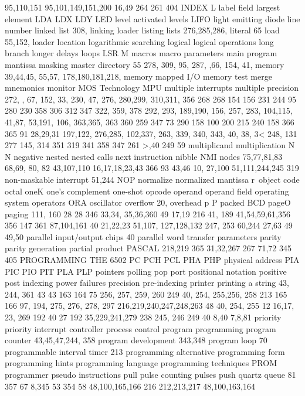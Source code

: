 {{{{{{{{{{{{{{{{{{{{{{{{{{{{{{{{{{{{{{{{{{{{{{{{{{{{{{{{{{{{{{{{{{{{{{{{{{{{{{{{{{{{{{{{{{{{{{{{{{{{{{{{{{{{{{{{{{{{{{{{{{{{{{{{{{{{{{{{{{{{95,110,151
95,101,149,151,200
16,49
264
261
404
INDEX
L
label field
largest element
LDA
LDX
LDY
LED
level activated
levels
LIFO
light emitting diode
line number
linked list
308,
linking loader
listing
lists 276,285,286,
literal 65
load 55,152,
loader
location
logarithmic searching
logical
logical operations
long branch
longer delays
loops
LSR
M
macros
macro parameters
main program
mantissa
masking
master directory
55
278,
309,
95,
287,
,66,
154,
41,
memory 39,44,45, 55,57,
178,180,181,218,
memory mapped I/O
memory test
merge
mnemonics
monitor
MOS Technology
MPU
multiple interrupts
multiple precision
272,
, 67, 152,
33, 230,
47, 276,
280,299,
310,311,
356
268
268
154
156
231
244
95
280
230
358
306
312
347
322, 359, 378
292, 293,
189,190,
156, 257,
283,
104,115,
41,87,
53,191,
106,
363,365,
363
360
259
347
73
290
158
100
200
215
240
158
366
365
91
28,29,31
197,122,
276,285,
102,337,
263,
339, 340,
343,
40,
38, 3<
248,
131
277
145,
314
351
319
341
358
347
261
>,40
249
59
multiplicand
multiplication
N
N
negative
nested
nested calls
next instruction
nibble
NMI
nodes
75,77,81,83
68,69, 80, 82
43,107,110
16,17,18,23,43
366
93
43,46
10, 27,100
51,111,244,245
319
non-maskable interrupt 51,244
NOP
normalize
normalized mantissa
r\
object code
octal
oneK
one's complement
one-shot
opcode
operand
operand field
operating system
operators
ORA
oscillator
overflow 20,
overhead
p
P
packed BCD
pageO
paging
111, 160
28
28
346
33,34, 35,36,360
49
17,19
216
41, 189
41,54,59,61,356
356
147
361
87,104,161
40
21,22,23 51,107,
127,128,132
247, 253
60,244
27,63
49
49,50
parallel input/output chips 40
parallel word transfer
parameters
parity
parity generation
partial product
PASCAL
218,219
365
31,32,267
267
71,72
345
405
PROGRAMMING THE 6502
PC
PCH
PCL
PHA
PHP
physical address
PIA
PIC
PIO
PIT
PLA
PLP
pointers
polling
pop
port
positional notation
positive
post indexing
power failures
precision
pre-indexing
printer
printing a string
43, 244, 361
43
43
163
164
75
256, 257, 259, 260
249
40, 254, 255,256, 258
213
165
166
97, 194, 275, 276, 278, 297
216,219,240,247,248,263
48
40, 254, 255
12
16,17, 23, 269
192
40
27
192
35,229,241,279
238
245, 246
249
40
8,40
7,8,81
priority
priority interrupt controller
process control
program
programming
program counter 43,45,47,244, 358
program development 343,348
program loop 70
programmable interval timer 213
programming alternative
programming form
programming hints
programming language
programming techniques
PROM programmer
pseudo instructions
pull
pulse counting
pulses
push
quartz
queue
81
357
67
8,345
53
354
58
48,100,165,166
216
212,213,217
48,100,163,164
}}}}}}}}}}}}}}}}}}}}}}}}}}}}}}}}}}}}}}}}}}}}}}}}}}}}}}}}}}}}}}}}}}}}}}}}}}}}}}}}}}}}}}}}}}}}}}}}}}}}}}}}}}}}}}}}}}}}}}}}}}}}}}}}}}}}}}}}}}}}
